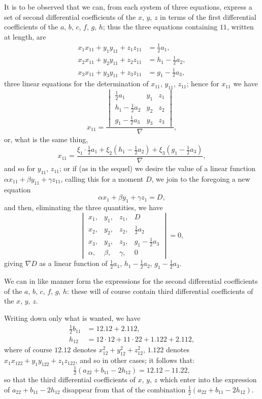 \documentclass[11pt,a4paper]{book}
\begin{document}
It is to be observed that we can, from each system of three equations, express a set of second differential coefficients of the $x$, $y$, $z$ in terms of the first differential coefficients of the $a$, $b$, $c$, $f$, $g$, $h$; thus the three equations containing $11$, written at length, are
\[
\begin{aligned}
x_1 x_{11} + y_1 y_{11} + z_1 z_{11} &= \tfrac{1}{2}a_1, \\
x_2 x_{11} + y_2 y_{11} + z_2 z_{11} &= h_1 - \tfrac{1}{2}a_2, \\
x_3 x_{11} + y_3 y_{11} + z_3 z_{11} &= g_1 - \tfrac{1}{2}a_3,
\end{aligned}
\]
three linear equations for the determination of $x_{11}$, $y_{11}$, $z_{11}$; hence for $x_{11}$ we have
\[
x_{11} = \frac{\begin{vmatrix} \tfrac{1}{2}a_1 & y_1 & z_1 \\ h_1 - \tfrac{1}{2}a_2 & y_2 & z_2 \\ g_1 - \tfrac{1}{2}a_3 & y_3 & z_3 \end{vmatrix}}{\nabla},
\]
or, what is the same thing,
\[
x_{11} = \frac{\xi_1 \cdot \tfrac{1}{2}a_1 + \xi_2(h_1 - \tfrac{1}{2}a_2) + \xi_3(g_1 - \tfrac{1}{2}a_3)}{\nabla},
\]
and so for $y_{11}$, $z_{11}$; or if (as in the sequel) we desire the value of a linear function $\alpha x_{11} + \beta y_{11} + \gamma z_{11}$, calling this for a moment $D$, we join to the foregoing a new equation
\[
\alpha x_1 + \beta y_1 + \gamma z_1 = D,
\]
and then, eliminating the three quantities, we have
\[
\begin{vmatrix}
x_1, & y_1, & z_1, & D \\
x_2, & y_2, & z_2, & \tfrac{1}{2}a_2 \\
x_3, & y_3, & z_3, & g_1 - \tfrac{1}{2}a_3 \\
\alpha, & \beta, & \gamma, & 0
\end{vmatrix} = 0,
\]
giving $\nabla D$ as a linear function of $\tfrac{1}{2}a_1$, $h_1 - \tfrac{1}{2}a_2$, $g_1 - \tfrac{1}{2}a_3$.

We can in like manner form the expressions for the second differential coefficients of the $a$, $b$, $c$, $f$, $g$, $h$: these will of course contain third differential coefficients of the $x$, $y$, $z$.

Writing down only what is wanted, we have
\[
\begin{aligned}
\tfrac{1}{2}b_{11} &= 12.12 + 2.112, \\
h_{12} &= 12 \cdot 12 + 11 \cdot 22 + 1.122 + 2.112,
\end{aligned}
\]
where of course $12.12$ denotes $x_{12}^2 + y_{12}^2 + z_{12}^2$, $1.122$ denotes $x_1 x_{122} + y_1 y_{122} + z_1 z_{122}$, and so in other cases; it follows that:
\[
\tfrac{1}{2}(a_{22} + b_{11} - 2h_{12}) = 12.12 - 11.22,
\]
so that the third differential coefficients of $x$, $y$, $z$ which enter into the expression of $a_{22} + b_{11} - 2h_{12}$ disappear from that of the combination $\tfrac{1}{2}(a_{22} + b_{11} - 2h_{12})$.
\end{document}
